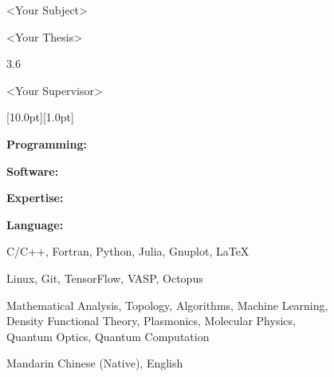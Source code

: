 \documentclass[12pt,a4paper,utf8]{report}
\begin{document}
    \begin{minipage}[t]{11cm}
        \textless Your Subject\textgreater \par
        \textless Your Thesis\textgreater \par
        3.6\par
        \textless Your Supervisor\textgreater \par
    \end{minipage}\par
\vspace{0.4cm}

\begin{minipage}[t]{16cm}
    \colorbox{subtitlecolor}{\raisebox{0pt}[10.0pt][1.0pt]{
        \textcolor{white}{\textsf{}}}}
\end{minipage}\par
\vspace{0.2cm}
    \begin{minipage}[t]{4cm}
        \qquad \textbf{Programming:}\par
        \qquad \textbf{Software:}\par
        \qquad \textbf{Expertise:}\par
        \qquad \par
        \qquad \par
        \qquad \textbf{Language:}\par
    \end{minipage}
    \begin{minipage}[t]{14cm}
        C/C++, Fortran, Python, Julia, Gnuplot, \LaTeX \par
        Linux, Git, TensorFlow, VASP, Octopus\par
        Mathematical Analysis, Topology, Algorithms, Machine Learning, \\
        Density Functional Theory, Plasmonics, Molecular Physics, \\
        Quantum Optics, Quantum Computation \par
        Mandarin Chinese (Native), English \par
    \end{minipage}\par
\vspace{0.4cm}
\end{document}
